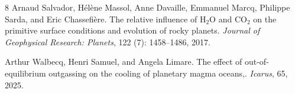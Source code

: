 \documentclass[referee]{aa}
\begin{document}
\begin{thebibliography}{8}
Arnaud Salvador, H{\'e}l{\`e}ne Massol, Anne Davaille, Emmanuel Marcq, Philippe
  Sarda, and Eric Chassefi{\`e}re.
\newblock The relative influence of {H$_2$O} and {CO$_2$} on the primitive
  surface conditions and evolution of rocky planets.
\newblock \emph{Journal of Geophysical Research: Planets}, 122
  (7): 1458--1486, 2017.

Arthur Walbecq, Henri Samuel, and Angela Limare.
\newblock The effect of out-of-equilibrium outgassing on the cooling of
  planetary magma oceans,.
\newblock \emph{Icarus}, 65, 2025.

\end{thebibliography}

\end{document}
